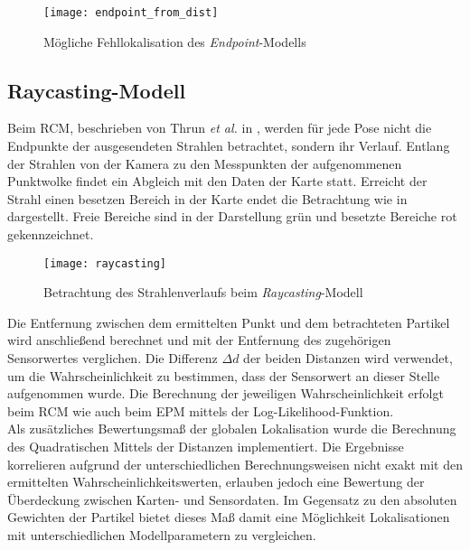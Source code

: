 
\begin{figure}[!ht]
	\begin{center}
		\texttt{[image: endpoint\_from\_dist]}
		\caption{Mögliche Fehllokalisation des \textit{Endpoint}-Modells}
		\label{fig.endpoint}
	\end{center}
\end{figure}

\subsection{Raycasting-Modell}
Beim RCM, beschrieben von Thrun \textit{et al.} in \cite{Thrun2005}, werden für jede Pose nicht die Endpunkte der ausgesendeten Strahlen betrachtet, sondern ihr Verlauf. Entlang der Strahlen von der Kamera zu den Messpunkten der aufgenommenen Punktwolke findet ein Abgleich mit den Daten der Karte statt. Erreicht der Strahl einen besetzen Bereich in der Karte endet die Betrachtung wie in  dargestellt. Freie Bereiche sind in der Darstellung grün und besetzte Bereiche rot gekennzeichnet.

\begin{figure}[!ht]
	\begin{center}
		\texttt{[image: raycasting]}
		\caption{Betrachtung des Strahlenverlaufs beim \textit{Raycasting}-Modell}
		\label{fig.raycast}
	\end{center}
\end{figure}

Die Entfernung zwischen dem ermittelten Punkt und dem betrachteten Partikel wird anschließend berechnet und mit der Entfernung des zugehörigen Sensorwertes verglichen. Die Differenz $\Delta d$ der beiden Distanzen wird verwendet, um die Wahrscheinlichkeit zu bestimmen, dass der Sensorwert an dieser Stelle aufgenommen wurde. Die Berechnung der jeweiligen Wahrscheinlichkeit erfolgt beim RCM wie auch beim EPM mittels der Log-Likelihood-Funktion.\\

Als zusätzliches Bewertungsmaß der globalen Lokalisation wurde die Berechnung des Quadratischen Mittels der Distanzen implementiert. Die Ergebnisse korrelieren aufgrund der unterschiedlichen Berechnungsweisen nicht exakt mit den ermittelten Wahrscheinlichkeitswerten, erlauben jedoch eine Bewertung der Überdeckung zwischen Karten- und Sensordaten. Im Gegensatz zu den absoluten Gewichten der Partikel bietet dieses Maß damit eine Möglichkeit Lokalisationen mit unterschiedlichen Modellparametern zu vergleichen.

